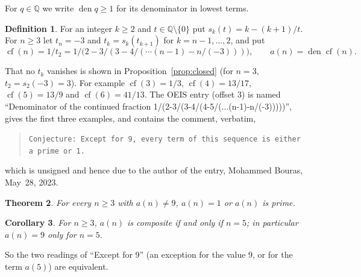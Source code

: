 \documentclass[11pt]{amsart}
\theoremstyle{plain}
\newtheorem{theorem}{Theorem}
\newtheorem{corollary}[theorem]{Corollary}
\theoremstyle{definition}
\newtheorem{definition}[theorem]{Definition}
\newcommand{\Q}{\mathbb{Q}}
\DeclareMathOperator{\den}{den}
\DeclareMathOperator{\cf}{cf}
\begin{document}
For $q\in\Q$ we write $\den q\ge1$ for its denominator in lowest terms.

\begin{definition}\label{def:a}
For an integer $k\ge2$ and $t\in\Q\setminus\{0\}$ put $s_k(t)=k-(k+1)/t$. For $n\ge3$ let $t_n=-3$ and $t_k=s_k(t_{k+1})$ for $k=n-1,\dots,2$, and put
\[
  \cf(n)=1/t_2=1/\bigl(2-3/(3-4/(\cdots(n-1)-n/(-3)))\bigr),\qquad a(n)=\den\cf(n).
\]
\end{definition}

That no $t_k$ vanishes is shown in Proposition~\ref{prop:closed} (for $n=3$, $t_2=s_2(-3)=3$). For example $\cf(3)=1/3$, $\cf(4)=13/17$, $\cf(5)=13/9$ and $\cf(6)=41/13$.
The OEIS entry \cite{A362086} (offset $3$) is named ``Denominator of the continued fraction 1/(2-3/(3-4/(4-5/(...(n-1)-n/(-3)))))'', gives the first three examples, and contains the comment, verbatim,
\begin{quote}
\texttt{Conjecture: Except for 9, every term of this sequence is either a prime or 1.}
\end{quote}
which is unsigned and hence due to the author of the entry, Mohammed Bouras, May~28, 2023.

\begin{theorem}\label{thm:main}
For every $n\ge3$ with $a(n)\ne9$, $a(n)=1$ or $a(n)$ is prime.
\end{theorem}

\begin{corollary}\label{cor:9}
For $n\ge3$, $a(n)$ is composite if and only if $n=5$; in particular $a(n)=9$ only for $n=5$.
\end{corollary}

So the two readings of ``Except for 9'' (an exception for the value $9$, or for the term $a(5)$) are equivalent.
\end{document}
